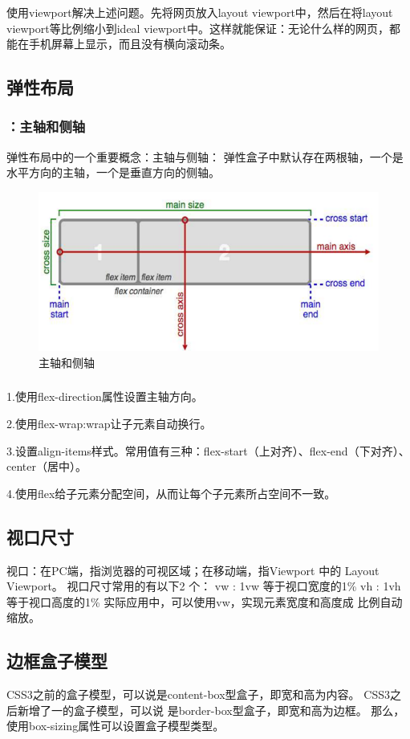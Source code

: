 \subsubsection*{}
使用viewport解决上述问题。先将网页放入layout viewport中，然后在将layout viewport等比例缩小到ideal viewport中。这样就能保证：无论什么样的网页，都能在手机屏幕上显示，而且没有横向滚动条。~\\

\subsection{弹性布局}
\subsubsection*{：主轴和侧轴}
弹性布局中的一个重要概念：主轴与侧轴： 弹性盒子中默认存在两根轴，一个是水平方向的主轴，一个是垂直方向的侧轴。
\begin{figure}[H]
    \centering
    \includegraphics[scale=0.7]{figures/2.2.9.png}
    \caption{主轴和侧轴}
\end{figure}

\subsubsection*{}
1.使用flex-direction属性设置主轴方向。

2.使用flex-wrap:wrap让子元素自动换行。

3.设置align-items样式。常用值有三种：flex-start（上对齐）、flex-end（下对齐）、center（居中）。

4.使用flex给子元素分配空间，从而让每个子元素所占空间不一致。~\\

\subsection{视口尺寸}
视口：在PC端，指浏览器的可视区域；在移动端，指Viewport 中的 Layout Viewport。 视口尺寸常用的有以下2
个： vw : 1vw 等于视口宽度的1\% vh : 1vh 等于视口高度的1\% 实际应用中，可以使用vw，实现元素宽度和高度成
比例自动缩放。~\\

\subsection{边框盒子模型}
CSS3之前的盒子模型，可以说是content-box型盒子，即宽和高为内容。 CSS3之后新增了一的盒子模型，可以说
是border-box型盒子，即宽和高为边框。 那么，使用box-sizing属性可以设置盒子模型类型。